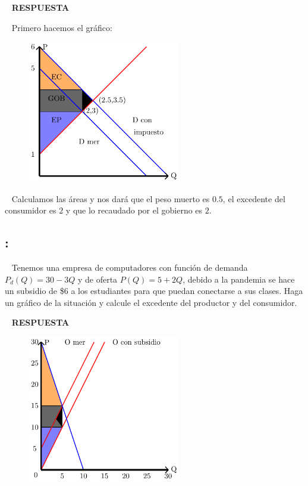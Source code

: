 \documentclass[
  letterpaper,
  DIV=11,
  numbers=noendperiod]{scrreport}
\begin{document}
~ \textbf{RESPUESTA}

~ Primero hacemos el gráfico:

\begin{figure}

{\centering \includegraphics[width=0.6\textwidth,height=\textheight]{8ej_pauta_files/figure-pdf/unnamed-chunk-10-1.pdf}

}

\end{figure}

~ Calculamos las áreas y nos dará que el peso muerto es \(0.5\), el
excedente del consumidor es \(2\) y que lo recaudado por el gobierno es
\(2\).

\hypertarget{section-30}{%
\subsection{:}\label{section-30}}

~ Tenemos una empresa de computadores con función de demanda
\(P_d(Q)=30-3Q\) y de oferta \(P(Q)=5+2Q\), debido a la pandemia se hace
un subsidio de \$6 a los estudiantes para que puedan conectarse a sus
clases. Haga un gráfico de la situación y calcule el excedente del
productor y del consumidor.

~ \textbf{RESPUESTA}

\begin{figure}

{\centering \includegraphics[width=0.6\textwidth,height=\textheight]{8ej_pauta_files/figure-pdf/unnamed-chunk-11-1.pdf}

}

\end{figure}
\end{document}
